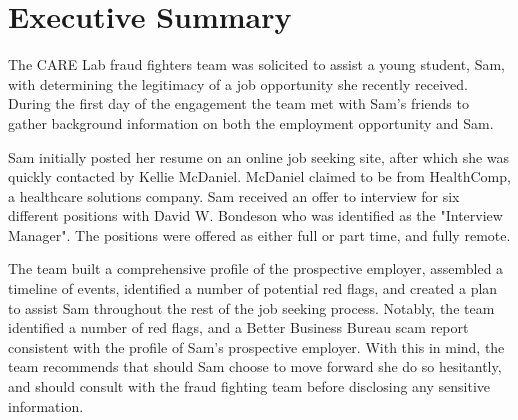 \section{Executive Summary} %
\begin{fullwidth}
The CARE Lab fraud fighters team was solicited to assist a young student, Sam, with determining the legitimacy of a job opportunity she recently received. During the first day of the engagement the team met with Sam's friends to gather background information on both the employment opportunity and Sam.\\\medskip

Sam initially posted her resume on an online job seeking site, after which she was quickly contacted by Kellie McDaniel. McDaniel claimed to be from HealthComp, a healthcare solutions company. Sam received an offer to interview for six different positions with David W. Bondeson who was identified as the "Interview Manager". The positions were offered as either full or part time, and fully remote.\\\medskip

The team built a comprehensive profile of the prospective employer, assembled a timeline of events, identified a number of potential red flags, and created a plan to assist Sam throughout the rest of the job seeking process. Notably, the team identified a number of red flags, and a Better Business Bureau scam report consistent with the profile of Sam's prospective employer. With this in mind, the team recommends that should Sam choose to move forward she do so hesitantly, and should consult with the fraud fighting team before disclosing any sensitive information.
\end{fullwidth}